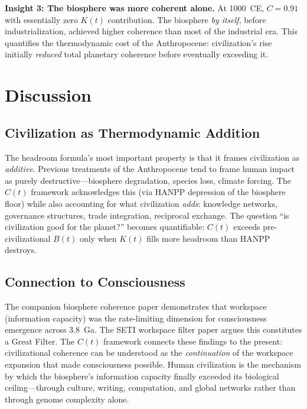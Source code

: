 \documentclass[10pt,letterpaper]{article}
\newcommand{\ct}{$C(t)$}
\begin{document}
\textbf{Insight 3: The biosphere was more coherent alone.} At 1000~CE,
$C = 0.91$ with essentially zero $K(t)$ contribution. The biosphere
\emph{by itself}, before industrialization, achieved higher coherence
than most of the industrial era. This quantifies the thermodynamic cost
of the Anthropocene: civilization's rise initially \emph{reduced} total
planetary coherence before eventually exceeding it.

\section*{Discussion}

\subsection*{Civilization as Thermodynamic Addition}

The headroom formula's most important property is that it frames
civilization as \emph{additive}. Previous treatments of the
Anthropocene tend to frame human impact as purely destructive---biosphere
degradation, species loss, climate forcing. The \ct{} framework
acknowledges this (via HANPP depression of the biosphere floor) while
also accounting for what civilization \emph{adds}: knowledge networks,
governance structures, trade integration, reciprocal exchange. The
question ``is civilization good for the planet?'' becomes quantifiable:
\ct{} exceeds pre-civilizational $B(t)$ only when $K(t)$ fills more
headroom than HANPP destroys.

\subsection*{Connection to Consciousness}

The companion biosphere coherence paper \cite{stoltz2026bt} demonstrates
that workspace (information capacity) was the rate-limiting dimension
for consciousness emergence across 3.8~Ga. The SETI workspace filter
paper \cite{stoltz2026seti} argues this constitutes a Great Filter.
The \ct{} framework connects these findings to the present: civilizational
coherence can be understood as the \emph{continuation} of the workspace
expansion that made consciousness possible. Human civilization is the
mechanism by which the biosphere's information capacity finally exceeded
its biological ceiling---through culture, writing, computation, and
global networks rather than through genome complexity alone.
\end{document}
